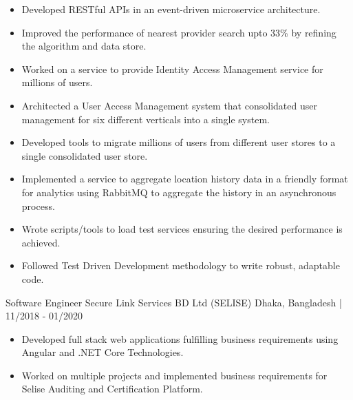 \documentclass{resumestyle}
\begin{document}
    \begin{itemize}[labelsep=4pt,leftmargin=*,topsep=5pt,partopsep=0pt,itemsep=1pt]%
        \item Developed RESTful APIs in an event-driven microservice architecture.%
        \item Improved the performance of nearest provider search upto 33\% by refining the algorithm and data store.
        \item Worked on a service to provide Identity Access Management service for millions of users.%
        \item Architected a User Access Management system that consolidated user management for six different verticals into a single system.%
        \item Developed tools to migrate millions of users from different user stores to a single consolidated user store.%
        \item Implemented a service to aggregate location history data in a friendly format for analytics using RabbitMQ to aggregate the history in an asynchronous process.%
        \item Wrote scripts/tools to load test services ensuring the desired performance is achieved.%
        \item Followed Test Driven Development methodology to write robust, adaptable code.%
    \end{itemize}%

    \vspace{4pt}%


    \worksubsection%
        {Software Engineer}%
        {Secure Link Services BD Ltd (SELISE)}%
        {Dhaka, Bangladesh | 11/2018 - 01/2020}%
    
    \begin{itemize}[labelsep=4pt,leftmargin=*,topsep=5pt,partopsep=0pt,itemsep=1pt]%
        \item Developed full stack web applications fulfilling business requirements using Angular and .NET Core Technologies.%
        \item Worked on multiple projects and implemented business requirements for Selise Auditing and Certification Platform.%
    \end{itemize}%

    \vspace{0pt}%

\end{document}
